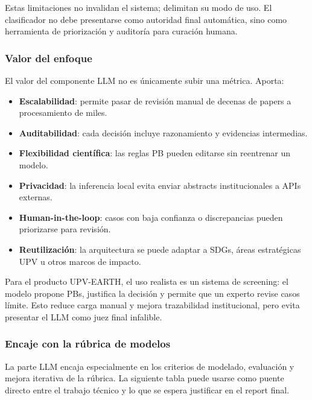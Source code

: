 Estas limitaciones no invalidan el sistema; delimitan su modo de uso. El clasificador no debe presentarse como autoridad final automática, sino como herramienta de priorización y auditoría para curación humana.

\subsubsection*{Valor del enfoque}

El valor del componente LLM no es únicamente subir una métrica. Aporta:

\begin{itemize}
\item \textbf{Escalabilidad}: permite pasar de revisión manual de decenas de papers a procesamiento de miles.
\item \textbf{Auditabilidad}: cada decisión incluye razonamiento y evidencias intermedias.
\item \textbf{Flexibilidad científica}: las reglas PB pueden editarse sin reentrenar un modelo.
\item \textbf{Privacidad}: la inferencia local evita enviar abstracts institucionales a APIs externas.
\item \textbf{Human-in-the-loop}: casos con baja confianza o discrepancias pueden priorizarse para revisión.
\item \textbf{Reutilización}: la arquitectura se puede adaptar a SDGs, áreas estratégicas UPV u otros marcos de impacto.
\end{itemize}

Para el producto UPV-EARTH, el uso realista es un sistema de screening: el modelo propone PBs, justifica la decisión y permite que un experto revise casos límite. Esto reduce carga manual y mejora trazabilidad institucional, pero evita presentar el LLM como juez final infalible.

\subsubsection*{Encaje con la rúbrica de modelos}

La parte LLM encaja especialmente en los criterios de modelado, evaluación y mejora iterativa de la rúbrica. La siguiente tabla puede usarse como puente directo entre el trabajo técnico y lo que se espera justificar en el report final.

